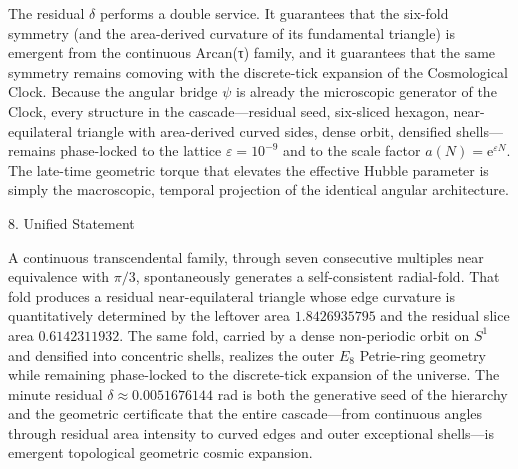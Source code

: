 The residual \(\delta\) performs a double service. It guarantees that the six-fold symmetry (and the area-derived curvature of its fundamental triangle) is emergent from the continuous Arcan(τ) family, and it guarantees that the same symmetry remains comoving with the discrete-tick expansion of the Cosmological Clock. Because the angular bridge \(\psi\) is already the microscopic generator of the Clock, every structure in the cascade—residual seed, six-sliced hexagon, near-equilateral triangle with area-derived curved sides, dense orbit, densified shells—remains phase-locked to the lattice \(\varepsilon=10^{-9}\) and to the scale factor \(a(N)=\mathrm{e}^{\varepsilon N}\). The late-time geometric torque that elevates the effective Hubble parameter is simply the macroscopic, temporal projection of the identical angular architecture.

8. Unified Statement

A continuous transcendental family, through seven consecutive multiples near equivalence with \(\pi/3\), spontaneously generates a self-consistent radial-fold. That fold produces a residual near-equilateral triangle whose edge curvature is quantitatively determined by the leftover area \(1.8426935795\) and the residual slice area \(0.6142311932\). The same fold, carried by a dense non-periodic orbit on \(S^1\) and densified into concentric shells, realizes the outer \(E_8\) Petrie-ring geometry while remaining phase-locked to the discrete-tick expansion of the universe. The minute residual \(\delta\approx 0.0051676144\) rad is both the generative seed of the hierarchy and the geometric certificate that the entire cascade—from continuous angles through residual area intensity to curved edges and outer exceptional shells—is emergent topological geometric cosmic expansion.
